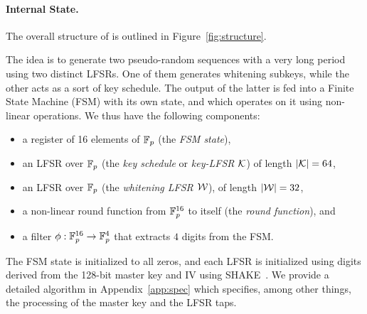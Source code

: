   




\paragraph{Internal State.}
The overall structure of \coolName{} is outlined in Figure~\ref{fig:structure}.

The idea is to generate two pseudo-random sequences with a very long
period using two distinct LFSRs. One of them generates whitening
subkeys, while the other acts as a sort of key schedule. The output of
the latter is fed into a Finite State Machine (FSM) with its own
state, and which operates on it using non-linear operations. We thus
have the following components:
\begin{itemize}
\item a register of 16 elements of $\mathbb{F}_{p}$ (the \emph{FSM state}),
\item an LFSR over $\mathbb{F}_{p}$ (the \emph{key schedule} or \emph{key-LFSR} $\mathcal{K}$) of length $|\mathcal{K}| = 64$, 
\item an LFSR over $\mathbb{F}_{p}$ (the \emph{whitening LFSR} $\mathcal{W}$), of length $|\mathcal{W}| = 32$,
\item a non-linear round function from $\mathbb{F}_{p}^{16}$ to itself (the \emph{round function}), and
\item a filter $\phi : \mathbb{F}_{p}^{16} \to \mathbb{F}_{p}^4$ that extracts $4$ digits from the FSM.
\end{itemize}


The FSM state is initialized to all zeros, and each LFSR is initialized using digits derived from the 128-bit master key and IV using SHAKE~\cite{add:SHA3}. 
\ifeprint
  We provide a detailed algorithm in Appendix~\ref{app:spec} which specifies, among other things, the processing of the master key and the LFSR taps. 
\fi


